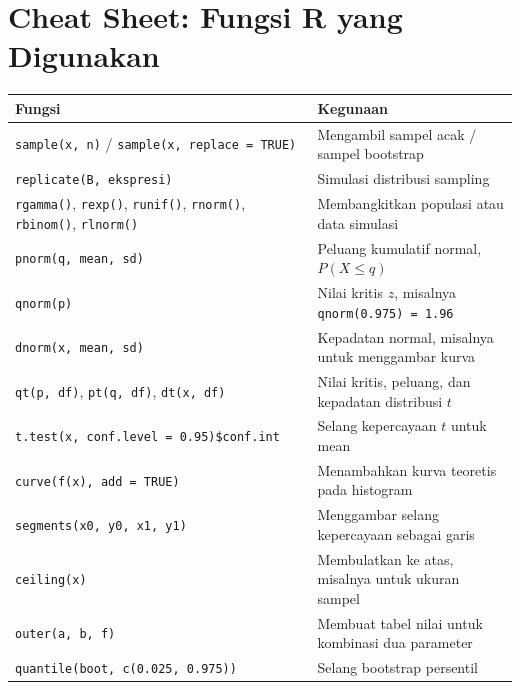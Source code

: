 \documentclass[
  indonesian,
  letterpaper,
]{book}
\newcounter{none} %
\begin{document}
\section{Cheat Sheet: Fungsi R yang
Digunakan}\label{cheat-sheet-fungsi-r-yang-digunakan}

{\def\LTcaptype{none} %
\begin{longtable}[]{@{}
  >{\raggedright\arraybackslash}p{}
  >{\raggedright\arraybackslash}p{}@{}}
\toprule\noalign{}
\begin{minipage}[b]{\linewidth}\raggedright
Fungsi
\end{minipage} & \begin{minipage}[b]{\linewidth}\raggedright
Kegunaan
\end{minipage} \\
\midrule\noalign{}
\endhead
\bottomrule\noalign{}
\endlastfoot
\texttt{sample(x,\ n)} / \texttt{sample(x,\ replace\ =\ TRUE)} &
Mengambil sampel acak / sampel bootstrap \\
\texttt{replicate(B,\ ekspresi)} & Simulasi distribusi sampling \\
\texttt{rgamma()}, \texttt{rexp()}, \texttt{runif()}, \texttt{rnorm()},
\texttt{rbinom()}, \texttt{rlnorm()} & Membangkitkan populasi atau data
simulasi \\
\texttt{pnorm(q,\ mean,\ sd)} & Peluang kumulatif normal,
\(P(X \le q)\) \\
\texttt{qnorm(p)} & Nilai kritis \(z\), misalnya
\texttt{qnorm(0.975)\ =\ 1.96} \\
\texttt{dnorm(x,\ mean,\ sd)} & Kepadatan normal, misalnya untuk
menggambar kurva \\
\texttt{qt(p,\ df)}, \texttt{pt(q,\ df)}, \texttt{dt(x,\ df)} & Nilai
kritis, peluang, dan kepadatan distribusi \(t\) \\
\texttt{t.test(x,\ conf.level\ =\ 0.95)\$conf.int} & Selang kepercayaan
\(t\) untuk mean \\
\texttt{curve(f(x),\ add\ =\ TRUE)} & Menambahkan kurva teoretis pada
histogram \\
\texttt{segments(x0,\ y0,\ x1,\ y1)} & Menggambar selang kepercayaan
sebagai garis \\
\texttt{ceiling(x)} & Membulatkan ke atas, misalnya untuk ukuran
sampel \\
\texttt{outer(a,\ b,\ f)} & Membuat tabel nilai untuk kombinasi dua
parameter \\
\texttt{quantile(boot,\ c(0.025,\ 0.975))} & Selang bootstrap
persentil \\
\end{longtable}
}
\end{document}
